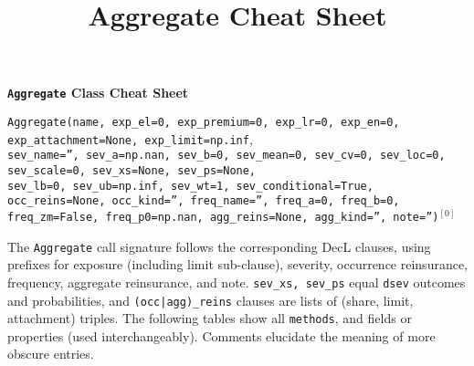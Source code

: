 %
%
%


\title{Aggregate Cheat Sheet}





{\huge{\bf \textbf{\texttt{Aggregate} Class Cheat Sheet}}}

\raggedright
 \texttt{\m Aggregate(name, exp\_el=0, exp\_premium=0, exp\_lr=0, exp\_en=0, exp\_attachment=None, exp\_limit=np.inf}, \\
 \texttt{\phantom{\m}sev\_name='', sev\_a=np.nan, sev\_b=0, sev\_mean=0, sev\_cv=0, sev\_loc=0, sev\_scale=0, sev\_xs=None, sev\_ps=None, } \\
 \texttt{\phantom{\m}sev\_lb=0, sev\_ub=np.inf, sev\_wt=1, sev\_conditional=True, }\\
 \texttt{\phantom{\m}occ\_reins=None, occ\_kind='', freq\_name='', freq\_a=0, freq\_b=0, freq\_zm=False, freq\_p0=np.nan, agg\_reins=None, agg\_kind='', note='')}${}^{[0]}$

The \texttt{Aggregate} call signature follows the corresponding DecL clauses, using prefixes for exposure (including limit sub-clause), severity, occurrence reinsurance, frequency, aggregate reinsurance, and note. \texttt{sev\_xs, sev\_ps} equal \texttt{dsev} outcomes and probabilities, and \texttt{(occ|agg)\_reins} clauses are lists of (share, limit, attachment) triples.
The following tables show all \texttt{\m methods}, and fields or properties (used interchangeably). Comments elucidate the meaning of more obscure entries.


